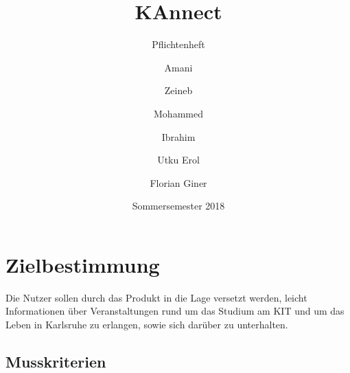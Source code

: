 \documentclass[parskip=full]{scrartcl}
\title{KAnnect}
\subtitle{Pflichtenheft}
\author{
		Amani
		\and Zeineb
		\and Mohammed
		\and Ibrahim
		\and Utku Erol
		\and Florian Giner
	}
\date{Sommersemester 2018}
\begin{document}
	\maketitle
	\newpage
	\tableofcontents
	\newpage
	\setlength{\parindent}{0em}
	\setlength{\parskip}{0.5em}
	
	\section{Zielbestimmung}
	Die Nutzer sollen durch das Produkt in die Lage versetzt werden, leicht Informationen über Veranstaltungen rund um das Studium am
	KIT und um das Leben in Karlsruhe zu erlangen, sowie sich darüber zu unterhalten.
	
	\subsection{Musskriterien}
	
\end{document}
